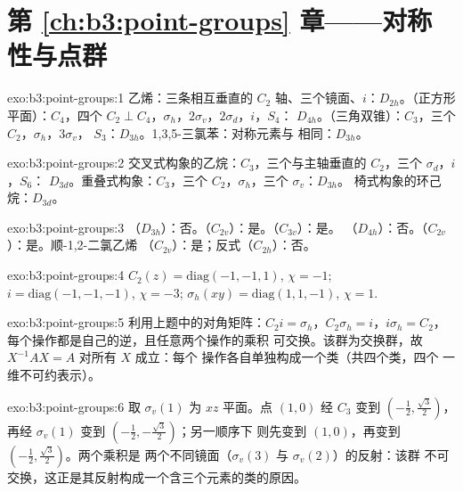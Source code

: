 \section*{第 \ref{ch:b3:point-groups} 章——对称性与点群}

\begin{solution}{exo:b3:point-groups:1}
乙烯：三条相互垂直的 $C_2$ 轴、三个镜面、$i$：$D_{2h}$。（正方形
平面）：$C_4$，四个 $C_2 \perp C_4$，$\sigma_h$，$2\sigma_v$，$2\sigma_d$，$i$，$S_4$：
$D_{4h}$。（三角双锥）：$C_3$，三个 $C_2$，$\sigma_h$，$3\sigma_v$，
$S_3$：$D_{3h}$。1,3,5-三氯苯：对称元素与  相同：$D_{3h}$。
\end{solution}

\begin{solution}{exo:b3:point-groups:2}
交叉式构象的乙烷：$C_3$，三个与主轴垂直的 $C_2$，三个 $\sigma_d$，$i$，$S_6$：
$D_{3d}$。重叠式构象：$C_3$，三个 $C_2$，$\sigma_h$，三个 $\sigma_v$：$D_{3h}$。
椅式构象的环己烷：$D_{3d}$。
\end{solution}

\begin{solution}{exo:b3:point-groups:3}
（$D_{3h}$）：否。（$C_{2v}$）：是。（$C_{3v}$）：是。
（$D_{4h}$）：否。（$C_{2v}$）：是。顺-1,2-二氯乙烯
（$C_{2v}$）：是；反式（$C_{2h}$）：否。
\end{solution}

\begin{solution}{exo:b3:point-groups:4}
$C_2(z) = \mathrm{diag}(-1,-1,1)$, $\chi = -1$; $i = \mathrm{diag}(-1,-1,-1)$,
$\chi = -3$; $\sigma_h(xy) = \mathrm{diag}(1,1,-1)$, $\chi = 1$.
\end{solution}

\begin{solution}{exo:b3:point-groups:5}
利用上题中的对角矩阵：$C_2i = \sigma_h$，$C_2\sigma_h =
i$，$i\sigma_h = C_2$，每个操作都是自己的逆，且任意两个操作的乘积
可交换。该群为交换群，故 $X^{-1}AX = A$ 对所有 $X$ 成立：每个
操作各自单独构成一个类（共四个类，四个
一维不可约表示）。
\end{solution}

\begin{solution}{exo:b3:point-groups:6}
取 $\sigma_v(1)$ 为 $xz$ 平面。点 $(1,0)$ 经 $C_3$ 变到 $(-\frac12,
\frac{\sqrt3}2)$，再经 $\sigma_v(1)$ 变到 $(-\frac12,-\frac{\sqrt3}2)$；另一顺序下
则先变到 $(1,0)$，再变到 $(-\frac12,\frac{\sqrt3}2)$。两个乘积是
两个不同镜面（$\sigma_v(3)$ 与 $\sigma_v(2)$）的反射：该群
不可交换，这正是其反射构成一个含三个元素的类的原因。
\end{solution}


